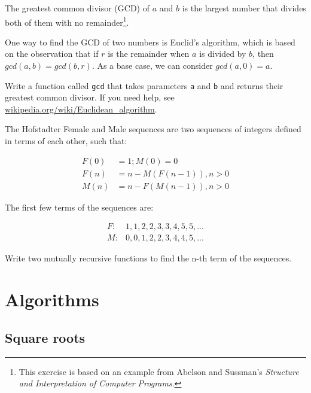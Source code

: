 \documentclass[10pt]{book}
\begin{document}
\begin{ex}


The greatest common divisor (GCD) of $a$ and $b$ is the largest number
that divides both of them with no remainder\footnote{This exercise is
  based on an example from Abelson and Sussman's {\em Structure and
    Interpretation of Computer Programs}.}.

One way to find the GCD of two numbers is Euclid's algorithm,
which is based on the observation that if $r$ is the remainder
when $a$ is divided by $b$, then $gcd(a, b) = gcd(b, r)$.
As a base case, we can consider $gcd(a, 0) = a$.


Write a function called
\verb"gcd" that takes parameters {\tt a} and {\tt b}
and returns their greatest common divisor.  If you need
help, see \url{wikipedia.org/wiki/Euclidean_algorithm}.

\end{ex}

\begin{ex}

The Hofstadter Female and Male sequences are two sequences of integers
defined in terms of each other, such that:

\begin{align*}
F(0) &= 1; M(0) = 0 \\
F(n) &= n - M(F(n-1)), n>0 \\
M(n) &= n - F(M(n-1)), n>0
\end{align*}

The first few terms of the sequences are:

\begin{align*}
F:& 1, 1, 2, 2, 3, 3, 4, 5, 5,... \\
M:& 0, 0, 1, 2, 2, 3, 4, 4, 5,... 
\end{align*}

Write two mutually recursive functions to find the n-th term of the 
sequences.

\end{ex}

\chapter{Algorithms}

\section{Square roots}
\end{document}

